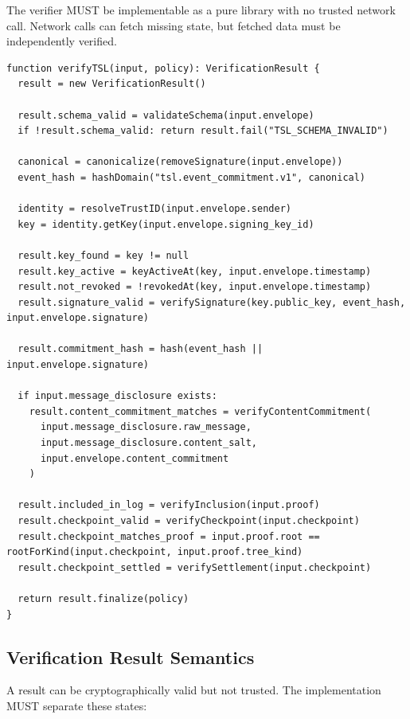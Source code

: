 \documentclass[11pt]{article}
\begin{document}
The verifier MUST be implementable as a pure library with no trusted network call. Network calls can fetch missing state, but fetched data must be independently verified.

\begin{lstlisting}[style=tslcode]
function verifyTSL(input, policy): VerificationResult {
  result = new VerificationResult()

  result.schema_valid = validateSchema(input.envelope)
  if !result.schema_valid: return result.fail("TSL_SCHEMA_INVALID")

  canonical = canonicalize(removeSignature(input.envelope))
  event_hash = hashDomain("tsl.event_commitment.v1", canonical)

  identity = resolveTrustID(input.envelope.sender)
  key = identity.getKey(input.envelope.signing_key_id)

  result.key_found = key != null
  result.key_active = keyActiveAt(key, input.envelope.timestamp)
  result.not_revoked = !revokedAt(key, input.envelope.timestamp)
  result.signature_valid = verifySignature(key.public_key, event_hash, input.envelope.signature)

  result.commitment_hash = hash(event_hash || input.envelope.signature)

  if input.message_disclosure exists:
    result.content_commitment_matches = verifyContentCommitment(
      input.message_disclosure.raw_message,
      input.message_disclosure.content_salt,
      input.envelope.content_commitment
    )

  result.included_in_log = verifyInclusion(input.proof)
  result.checkpoint_valid = verifyCheckpoint(input.checkpoint)
  result.checkpoint_matches_proof = input.proof.root == rootForKind(input.checkpoint, input.proof.tree_kind)
  result.checkpoint_settled = verifySettlement(input.checkpoint)

  return result.finalize(policy)
}
\end{lstlisting}


\subsection{Verification Result Semantics}

A result can be cryptographically valid but not trusted. The implementation MUST separate these states:
\end{document}
